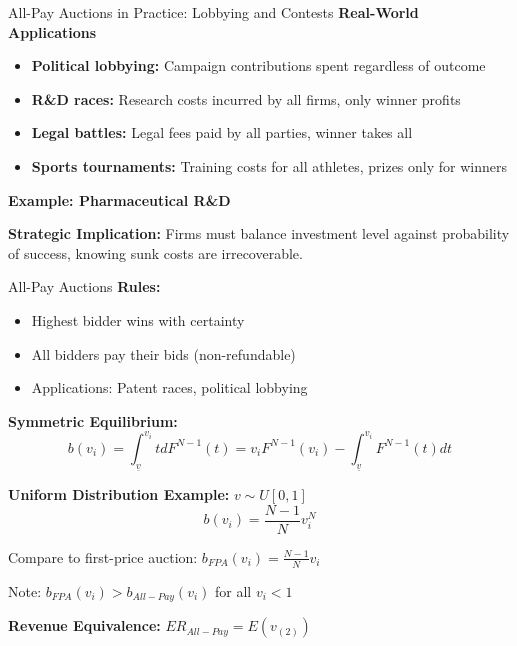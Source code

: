 \documentclass[xcolor={x11names}]{beamer}
\begin{document}
\begin{frame}{All-Pay Auctions in Practice: Lobbying and Contests}
\textbf{Real-World Applications}
\begin{itemize}
  \item \textbf{Political lobbying:} Campaign contributions spent regardless of outcome
  \item \textbf{R\&D races:} Research costs incurred by all firms, only winner profits
  \item \textbf{Legal battles:} Legal fees paid by all parties, winner takes all
  \item \textbf{Sports tournaments:} Training costs for all athletes, prizes only for winners
\end{itemize}

\textbf{Example: Pharmaceutical R\&D}
\begin{center}
\end{center}

\textbf{Strategic Implication:} Firms must balance investment level against probability of success, knowing sunk costs are irrecoverable.
\end{frame}


\begin{frame}{All-Pay Auctions}
\textbf{Rules:}
\begin{itemize}
\item Highest bidder wins with certainty
\item All bidders pay their bids (non-refundable)
\item Applications: Patent races, political lobbying
\end{itemize}

\textbf{Symmetric Equilibrium:}
$$b(v_i) = \int_{\underline{v}}^{v_i} t dF^{N-1}(t) = v_i F^{N-1}(v_i) - \int_{\underline{v}}^{v_i} F^{N-1}(t)dt$$

\textbf{Uniform Distribution Example:} $v \sim U[0,1]$
$$b(v_i) = \frac{N-1}{N} v_i^N$$

Compare to first-price auction: $b_{FPA}(v_i) = \frac{N-1}{N} v_i$

Note: $b_{FPA}(v_i) > b_{All-Pay}(v_i)$ for all $v_i < 1$

\textbf{Revenue Equivalence:} $ER_{All-Pay} = E(v_{(2)})$
\end{frame}
\end{document}
